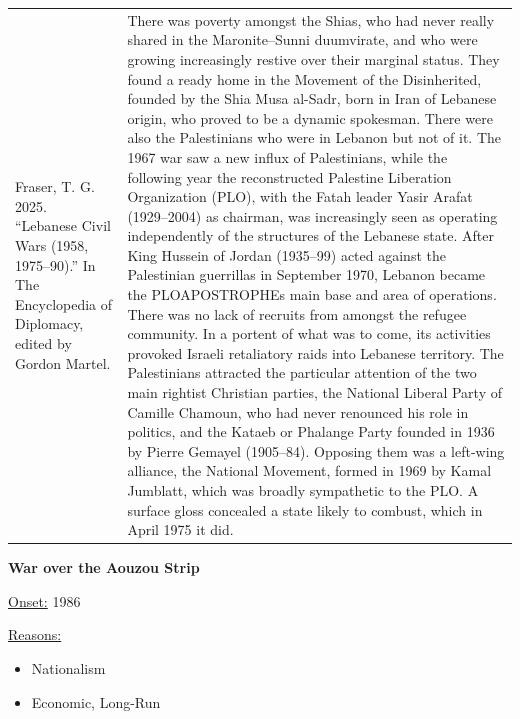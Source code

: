 {\begin{longtable}{p{}p{}}
Fraser, T. G. 2025. “Lebanese Civil Wars (1958, 1975–90).” In The Encyclopedia of Diplomacy, edited by Gordon Martel. & There was poverty amongst the Shias, who had never really shared in the Maronite–Sunni duumvirate, and who were growing increasingly restive over their marginal status. They found a ready home in the Movement of the Disinherited, founded by the Shia Musa al-Sadr, born in Iran of Lebanese origin, who proved to be a dynamic spokesman. There were also the Palestinians who were in Lebanon but not of it. The 1967 war saw a new influx of Palestinians, while the following year the reconstructed Palestine Liberation Organization (PLO), with the Fatah leader Yasir Arafat (1929–2004) as chairman, was increasingly seen as operating independently of the structures of the Lebanese state. After King Hussein of Jordan (1935–99) acted against the Palestinian guerrillas in September 1970, Lebanon became the PLOAPOSTROPHEs main base and area of operations. There was no lack of recruits from amongst the refugee community. In a portent of what was to come, its activities provoked Israeli retaliatory raids into Lebanese territory. The Palestinians attracted the particular attention of the two main rightist Christian parties, the National Liberal Party of Camille Chamoun, who had never renounced his role in politics, and the Kataeb or Phalange Party founded in 1936 by Pierre Gemayel (1905–84). Opposing them was a left-wing alliance, the National Movement, formed in 1969 by Kamal Jumblatt, which was broadly sympathetic to the PLO. A surface gloss concealed a state likely to combust, which in April 1975 it did.
\\
\end{longtable}}
\clearpage
         \textbf{War over the Aouzou Strip} 

          \underline{Onset:} 1986         

\underline{Reasons:}
\begin{itemize}
\item Nationalism
\item Economic, Long-Run
\end{itemize}

